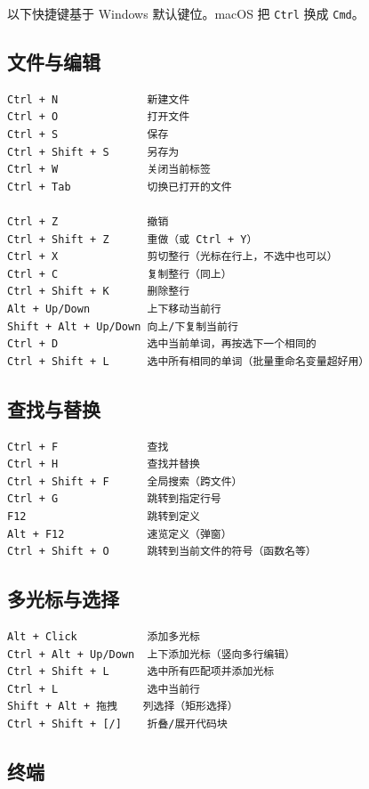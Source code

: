 \documentclass[UTF8,openany,oneside,zihao=-4]{ctexbook}
\begin{document}
\begin{note}
以下快捷键基于 Windows 默认键位。macOS 把 \lstinline|Ctrl| 换成 \lstinline|Cmd|。
\end{note}

\subsection{文件与编辑}

\begin{lstlisting}
Ctrl + N              新建文件
Ctrl + O              打开文件
Ctrl + S              保存
Ctrl + Shift + S      另存为
Ctrl + W              关闭当前标签
Ctrl + Tab            切换已打开的文件

Ctrl + Z              撤销
Ctrl + Shift + Z      重做（或 Ctrl + Y）
Ctrl + X              剪切整行（光标在行上，不选中也可以）
Ctrl + C              复制整行（同上）
Ctrl + Shift + K      删除整行
Alt + Up/Down         上下移动当前行
Shift + Alt + Up/Down 向上/下复制当前行
Ctrl + D              选中当前单词，再按选下一个相同的
Ctrl + Shift + L      选中所有相同的单词（批量重命名变量超好用）
\end{lstlisting}

\subsection{查找与替换}

\begin{lstlisting}
Ctrl + F              查找
Ctrl + H              查找并替换
Ctrl + Shift + F      全局搜索（跨文件）
Ctrl + G              跳转到指定行号
F12                   跳转到定义
Alt + F12             速览定义（弹窗）
Ctrl + Shift + O      跳转到当前文件的符号（函数名等）
\end{lstlisting}

\subsection{多光标与选择}

\begin{lstlisting}
Alt + Click           添加多光标
Ctrl + Alt + Up/Down  上下添加光标（竖向多行编辑）
Ctrl + Shift + L      选中所有匹配项并添加光标
Ctrl + L              选中当前行
Shift + Alt + 拖拽    列选择（矩形选择）
Ctrl + Shift + [/]    折叠/展开代码块
\end{lstlisting}

\subsection{终端}
\end{document}
